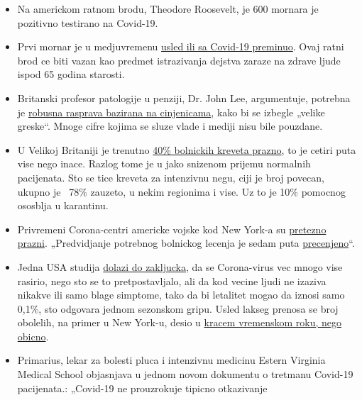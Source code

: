 \begin{itemize}
\tightlist
\item
  Na americkom ratnom brodu, Theodore Roosevelt, je 600 mornara je
  pozitivno testirano na Covid-19.
\item
  Prvi mornar je u medjuvremenu
  \href{https://www.theguardian.com/world/2020/apr/14/sailor-dies-from-covid-19-and-600-test-positive-after-outbreak-on-uss-theodore-roosevelt-guam}{usled
  ili sa Covid-19 preminuo}. Ovaj ratni brod ce biti vazan kao predmet
  istrazivanja dejstva zaraze na zdrave ljude ispod 65 godina starosti.
\item
  Britanski profesor patologije u penziji, Dr. John Lee, argumentuje,
  potrebna je
  \href{https://www.spectator.co.uk/article/to-understand-covid-we-need-evidence-scepticism-and-vigorous-debate}{robusna
  rasprava bazirana na cinjenicama}, kako bi se izbegle „velike
  greske``. Mnoge cifre kojima se sluze vlade i mediji nisu bile
  pouzdane.
\item
  U Velikoj Britaniji je trenutno
  \href{https://www.hsj.co.uk/acute-care/nhs-hospitals-have-four-times-more-empty-beds-than-normal/7027392.article}{40\%
  bolnickih kreveta prazno}, to je cetiri puta vise nego inace. Razlog
  tome je u jako snizenom prijemu normalnih pacijenata. Sto se tice
  kreveta za intenzivnu negu, ciji je broj povecan, ukupno je~ 78\%
  zauzeto, u nekim regionima i vise. Uz to je 10\% pomocnog ososblja u
  karantinu.
\item
  Privremeni Corona-centri americke vojske kod New York-a su
  \href{https://nypost.com/2020/04/09/usns-comfort-and-javits-center-mostly-empty-amid-coronavirus/}{pretezno
  prazni}. „Predvidjanje potrebnog bolnickog lecenja je sedam puta
  \href{https://www.nytimes.com/2020/04/10/nyregion/new-york-coronavirus-hospitals.html}{precenjeno}``.
\item
  Jedna USA studija
  \href{https://www.medrxiv.org/content/10.1101/2020.04.01.20050542v2}{dolazi
  do zakljucka}, da se Corona-virus vec mnogo vise rasirio, nego sto se
  to pretpostavljalo, ali da kod vecine ljudi ne izaziva nikakve ili
  samo blage simptome, tako da bi letalitet mogao da iznosi samo 0,1\%,
  sto odgovara jednom sezonskom gripu. Usled lakseg prenosa se broj
  obolelih, na primer u New York-u, desio u
  \href{https://archive.is/7w2XE}{kracem vremenskom roku, nego obicno}.
\item
  Primarius, lekar za bolesti pluca i intenzivnu medicinu Estern
  Virginia Medical School objasnjava u jednom novom dokumentu o tretmanu
  Covid-19 pacijenata.: „Covid-19 ne prouzrokuje tipicno otkazivanje

\end{itemize}
